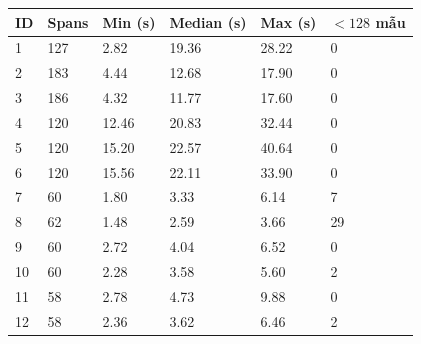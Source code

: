 \begin{tabular}{llllll}
\toprule
ID & Spans & Min (s) & Median (s) & Max (s) & $<128$ mẫu \\
\midrule
1 & 127 & 2.82 & 19.36 & 28.22 & 0 \\
2 & 183 & 4.44 & 12.68 & 17.90 & 0 \\
3 & 186 & 4.32 & 11.77 & 17.60 & 0 \\
4 & 120 & 12.46 & 20.83 & 32.44 & 0 \\
5 & 120 & 15.20 & 22.57 & 40.64 & 0 \\
6 & 120 & 15.56 & 22.11 & 33.90 & 0 \\
7 & 60 & 1.80 & 3.33 & 6.14 & 7 \\
8 & 62 & 1.48 & 2.59 & 3.66 & 29 \\
9 & 60 & 2.72 & 4.04 & 6.52 & 0 \\
10 & 60 & 2.28 & 3.58 & 5.60 & 2 \\
11 & 58 & 2.78 & 4.73 & 9.88 & 0 \\
12 & 58 & 2.36 & 3.62 & 6.46 & 2 \\
\bottomrule
\end{tabular}
